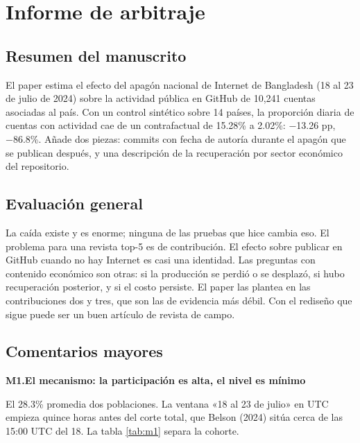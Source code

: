 \documentclass[11pt,a4paper]{article}
\newcommand{\coment}[2]{\medskip\noindent\textbf{#1.\enspace #2}\par\nopagebreak}
\begin{document}
\section{Informe de arbitraje}

\subsection{Resumen del manuscrito}

El paper estima el efecto del apagón nacional de Internet de Bangladesh (18 al 23 de julio de 2024)
sobre la actividad pública en GitHub de 10,241 cuentas asociadas al país. Con un control sintético
sobre 14 países, la proporción diaria de cuentas con actividad cae de un contrafactual de 15.28\% a
2.02\%: −13.26 pp, −86.8\%. Añade dos piezas: commits con fecha de autoría durante el apagón que se
publican después, y una descripción de la recuperación por sector económico del repositorio.

\subsection{Evaluación general}

La caída existe y es enorme; ninguna de las pruebas que hice cambia eso. El problema para una revista
top-5 es de contribución. El efecto sobre publicar en GitHub cuando no hay Internet es casi una
identidad. Las preguntas con contenido económico son otras: si la producción se perdió o se desplazó,
si hubo recuperación posterior, y si el costo persiste. El paper las plantea en las contribuciones dos
y tres, que son las de evidencia más débil. Con el rediseño que sigue puede ser un buen artículo de
revista de campo.

\subsection{Comentarios mayores}

\coment{M1}{El mecanismo: la participación es alta, el nivel es mínimo}
El 28.3\% promedia dos poblaciones. La ventana «18 al 23 de julio» en UTC empieza quince horas antes
del corte total, que Belson (2024) sitúa cerca de las 15:00 UTC del 18. La tabla \ref{tab:m1} separa
la cohorte.
\end{document}
